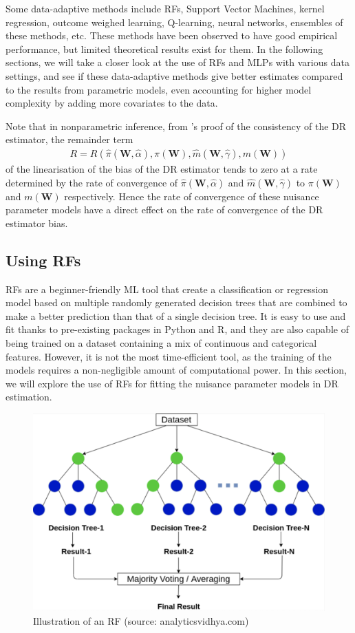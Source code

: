 \documentclass[12pt,twoside]{article}
\begin{document}
Some data-adaptive methods include RFs, Support Vector Machines, kernel regression, outcome weighed learning, Q-learning, neural networks, ensembles of these methods, etc. These methods have been observed to have good empirical performance, but limited theoretical results exist for them. In the following sections, we will take a closer look at the use of RFs and MLPs with various data settings, and see if these data-adaptive methods give better estimates compared to the results from parametric models, even accounting for higher model complexity by adding more covariates to the data.

Note that in nonparametric inference, from \cite{benkeser2017}'s proof of the consistency of the DR estimator, the remainder term 
\begin{align*}
R = R(\hat\pi(\mathbf{W},\hat{\alpha}), \pi(\mathbf{W}), \hat m(\mathbf{W}, \hat\gamma), m(\mathbf{W}))
\end{align*}
of the linearisation of the bias of the DR estimator tends to zero at a rate determined by the rate of convergence of  $\hat\pi(\mathbf{W},\hat{\alpha})$ and  $\hat m(\mathbf{W}, \hat\gamma)$ to $\pi(\mathbf{W})$ and $m(\mathbf{W})$ respectively. Hence the rate of convergence of these nuisance parameter models have a direct effect on the rate of convergence of the DR estimator bias.

\subsection{Using RFs}

RFs are a beginner-friendly ML tool that create a classification or regression model based on multiple randomly generated decision trees that are combined to make a better prediction than that of a single decision tree. It is easy to use and fit thanks to pre-existing packages in Python and R, and they are also capable of being trained on a dataset containing a mix of continuous and categorical features. However, it is not the most time-efficient tool, as the training of the models requires a non-negligible amount of computational power. In this section, we will explore the use of RFs for fitting the nuisance parameter models in DR estimation.

\begin{figure}
    \centering
    \includegraphics[width = 0.7\columnwidth]{figures/tree.png}
    \caption{Illustration of an RF (source: analyticsvidhya.com)}
    \label{fig:my_label}
\end{figure}
\end{document}
